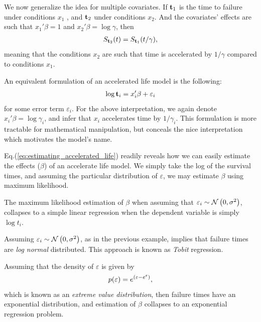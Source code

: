 We now generalize the idea for multiple covariates.
If $\mathbf{t}_1$ is the time to failure under conditions $x_1$ , and $\mathbf{t}_2$ under conditions $x_2$. 
And the covariates' effects are such that $x_1' \beta=1$ and $x_2' \beta=\log \gamma$,  then 
\begin{align}
\label{eq:accelerated_life}
	S_{\mathbf{t}_2} (t)=S_{\mathbf{t}_1} (t/\gamma),
\end{align}
meaning that the conditions $x_2$ are such that time is accelerated by $1/\gamma$ compared to conditions $x_1$.


An equivalent formulation of an accelerated life model is the following:
\begin{align}
\label{eq:estimating_accelerated_life}
	\log \mathbf{t}_i = x_i'\beta + \varepsilon_i
\end{align}
for some error term $\varepsilon_i$. 
For the above interpretation, we again denote $x_i'\beta= \log \gamma_i$, and infer that $x_i$ accelerates time by $1/\gamma_i$. 
This formulation is more tractable for mathematical manipulation, but conceals the nice interpretation which motivates the model's name.

Eq.(\ref{eq:estimating_accelerated_life}) readily reveals how we can easily estimate the effects ($\beta$) of an accelerate life model.
We simply take the log of the survival times, and assuming the particular distribution of $\varepsilon$, we may estimate $\beta$ using maximum likelihood.



\begin{example}
\label{eg:accelerated_gaussian}
The maximum likelihood estimation of $\beta$ when assuming that $\varepsilon_i \sim \mathcal{N}\left(0,\sigma^2\right)$, collapses to a simple linear regression when the dependent variable is simply $\log t_i$.
\end{example}


\begin{extra}
Assuming $\varepsilon_i \sim \mathcal{N}\left(0,\sigma^2\right)$, as in the previous example, implies that failure times are \emph{log normal} distributed. 
This approach is known as \emph{Tobit} regression.
\end{extra}


\begin{example}
\label{eg:accelerated_exponential}
Assuming that the density of $\varepsilon$ is given by 
$$
	p(\varepsilon)=e^{(\varepsilon-e^\varepsilon)}, 
$$
which is known as an \emph{extreme value distribution}, then failure times have an exponential distribution, and estimation of $\beta$ collapses to an exponential regression problem.
\end{example}





